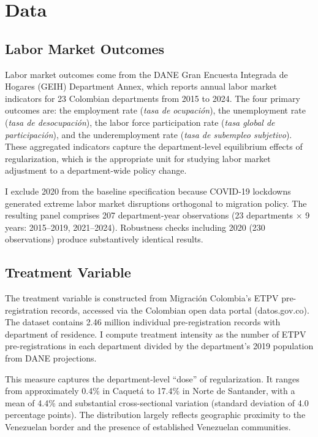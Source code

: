 \documentclass[12pt]{article}
\begin{document}
\section{Data}

\subsection{Labor Market Outcomes}

Labor market outcomes come from the DANE Gran Encuesta Integrada de Hogares (GEIH) Department Annex, which reports annual labor market indicators for 23 Colombian departments from 2015 to 2024. The four primary outcomes are: the employment rate (\textit{tasa de ocupaci\'on}), the unemployment rate (\textit{tasa de desocupaci\'on}), the labor force participation rate (\textit{tasa global de participaci\'on}), and the underemployment rate (\textit{tasa de subempleo subjetivo}). These aggregated indicators capture the department-level equilibrium effects of regularization, which is the appropriate unit for studying labor market adjustment to a department-wide policy change.

I exclude 2020 from the baseline specification because COVID-19 lockdowns generated extreme labor market disruptions orthogonal to migration policy. The resulting panel comprises 207 department-year observations (23 departments $\times$ 9 years: 2015--2019, 2021--2024). Robustness checks including 2020 (230 observations) produce substantively identical results.

\subsection{Treatment Variable}

The treatment variable is constructed from Migraci\'on Colombia's ETPV pre-registration records, accessed via the Colombian open data portal (datos.gov.co). The dataset contains 2.46 million individual pre-registration records with department of residence. I compute treatment intensity as the number of ETPV pre-registrations in each department divided by the department's 2019 population from DANE projections.

This measure captures the department-level ``dose'' of regularization. It ranges from approximately 0.4\% in Caquet\'a to 17.4\% in Norte de Santander, with a mean of 4.4\% and substantial cross-sectional variation (standard deviation of 4.0 percentage points). The distribution largely reflects geographic proximity to the Venezuelan border and the presence of established Venezuelan communities.
\end{document}
